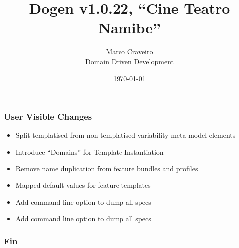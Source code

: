 \documentclass{beamer}
\title{Dogen v1.0.22, \enquote{Cine Teatro Namibe}}
\author{Marco Craveiro \\
  Domain Driven Development
}
\date{\today}
\begin{document}
\begin{frame}
\titlepage{}
\end{frame}

\begin{frame}
\frametitle{User Visible Changes}

\begin{itemize}
  \pause{}
\item Split templatised from non-templatised variability meta-model elements
  \pause{}
\item Introduce \enquote{Domains} for Template Instantiation
  \pause{}
\item Remove name duplication from feature bundles and profiles
  \pause{}
\item Mapped default values for feature templates
  \pause{}
\item Add command line option to dump all specs
  \pause{}
\item Add command line option to dump all specs
  \pause{}
\end{itemize}

\end{frame}

\begin{frame}
\frametitle{Fin}
\end{frame}
\end{document}

